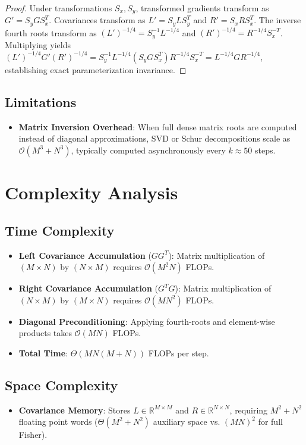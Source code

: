 \documentclass[11pt,a4paper]{article}
\theoremstyle{definition}
\begin{document}
\begin{proof}
Under transformations $S_x, S_y$, transformed gradients transform as $G' = S_y G S_x^T$. Covariances transform as $L' = S_y L S_y^T$ and $R' = S_x R S_x^T$. The inverse fourth roots transform as $(L')^{-1/4} = S_y^{-1} L^{-1/4}$ and $(R')^{-1/4} = R^{-1/4} S_x^{-T}$. Multiplying yields $(L')^{-1/4} G' (R')^{-1/4} = S_y^{-1} L^{-1/4} (S_y G S_x^T) R^{-1/4} S_x^{-T} = L^{-1/4} G R^{-1/4}$, establishing exact parameterization invariance.
\end{proof}

\subsection{Limitations}
\begin{itemize}
    \item \textbf{Matrix Inversion Overhead}: When full dense matrix roots are computed instead of diagonal approximations, SVD or Schur decompositions scale as $\mathcal{O}(M^3 + N^3)$, typically computed asynchronously every $k \approx 50$ steps.
\end{itemize}

\section{Complexity Analysis}

\subsection{Time Complexity}
\begin{itemize}
    \item \textbf{Left Covariance Accumulation} ($G G^T$): Matrix multiplication of $(M \times N)$ by $(N \times M)$ requires $\mathcal{O}(M^2 N)$ FLOPs.
    \item \textbf{Right Covariance Accumulation} ($G^T G$): Matrix multiplication of $(N \times M)$ by $(M \times N)$ requires $\mathcal{O}(M N^2)$ FLOPs.
    \item \textbf{Diagonal Preconditioning}: Applying fourth-roots and element-wise products takes $\mathcal{O}(MN)$ FLOPs.
    \item \textbf{Total Time}: $\Theta(MN(M + N))$ FLOPs per step.
\end{itemize}

\subsection{Space Complexity}
\begin{itemize}
    \item \textbf{Covariance Memory}: Stores $L \in \mathbb{R}^{M \times M}$ and $R \in \mathbb{R}^{N \times N}$, requiring $M^2 + N^2$ floating point words ($\Theta(M^2 + N^2)$ auxiliary space vs. $(MN)^2$ for full Fisher).
\end{itemize}
\end{document}
